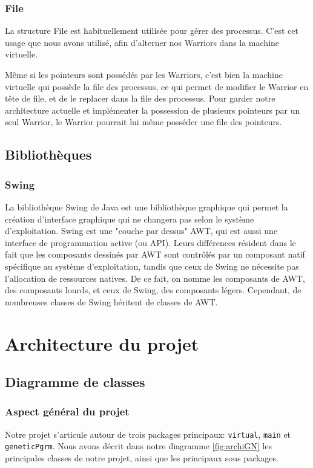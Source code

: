 \documentclass[hidelinks]{report}
\begin{document}
\subsection{File}
La structure File est habituellement utilisée pour gérer des processus. C'est cet usage que nous avons utilisé, afin d'alterner nos Warriors dans la machine virtuelle.

Même si les pointeurs sont possédés par les Warriors, c'est bien la machine virtuelle qui possède la file des processus, ce qui permet de modifier le Warrior en tête de file, et de le replacer dans la file des processus. Pour garder notre architecture actuelle et implémenter la possession de plusieurs pointeurs par un seul Warrior, le Warrior pourrait lui même posséder une file des pointeurs.

\section{Bibliothèques}
\subsection{Swing}
La bibliothèque Swing de Java est une bibliothèque graphique qui permet la création d'interface graphique qui ne changera pas selon le système d'exploitation. Swing est une "couche par dessus" AWT, qui est aussi une interface de programmation active (ou API). Leurs différences résident dans le fait que les composants dessinés par AWT sont contrôlés par un composant natif spécifique au système d'exploitation, tandis que ceux de Swing ne nécessite pas l'allocation de ressources natives. De ce fait, on nomme les composants de AWT, des composants lourds, et ceux de Swing, des composants légers. Cependant, de nombreuses classes de Swing héritent de classes de AWT.

\chapter{Architecture du projet \label{chap:Archi}}

\section{Diagramme de classes}
\subsection{Aspect général du projet}
Notre projet s'articule autour de trois packages principaux: \texttt{virtual}, \texttt{main} et \texttt{geneticPgrm}. Nous avons décrit dans notre diagramme \autoref{fig:archiGN} les principales classes de notre projet, ainsi que les principaux sous packages.
\end{document}
